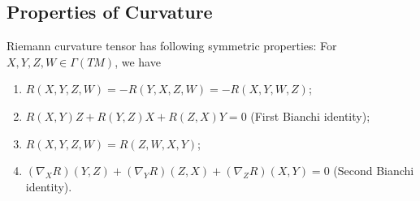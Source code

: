 \subsection*{Properties of Curvature}
\begin{prop}\label{curvature symmetric}
    Riemann curvature tensor has following symmetric properties:
    For $X,Y,Z,W\in\Gamma(TM)$, we have
    \begin{enumerate}[(1)]
        \item $R(X,Y,Z,W)=-R(Y,X,Z,W)=-R(X,Y,W,Z)$;
        \item $R(X,Y)Z+R(Y,Z)X+R(Z,X)Y=0$ (First Bianchi identity);
        \item $R(X,Y,Z,W)=R(Z,W,X,Y)$;
        \item $(\nabla_XR)(Y,Z)+(\nabla_YR)(Z,X)+(\nabla_ZR)(X,Y)=0$ (Second Bianchi identity).
    \end{enumerate}
\end{prop}
